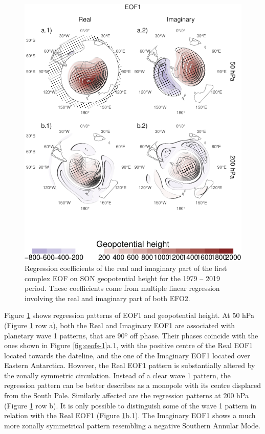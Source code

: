 \documentclass[smallextended]{svjour3}       %
\begin{document}
\begin{figure}
\centering
\includegraphics{../figures/eof1-regr-gh-1.pdf}
\caption{\label{fig:eof1-regr-gh}Regression coefficients of the real and imaginary part of the first complex EOF on SON geopotential height for the 1979 -- 2019 period. These coefficients come from multiple linear regression involving the real and imaginary part of both EFO2.}
\end{figure}

Figure \ref{fig:eof1-regr-gh} shows regression patterns of EOF1 and geopotential height. At 50 hPa (Figure \ref{fig:eof1-regr-gh} row a), both the Real and Imaginary EOF1 are associated with planetary wave 1 patterns, that are 90º off phase. Their phases coincide with the ones shown in Figure \ref{fig:ceofs-1}a.1, with the positive centre of the Real EOF1 located towards the dateline, and the one of the Imaginary EOF1 located over Eastern Antarctica. However, the Real EOF1 pattern is substantially altered by the zonally symmetric circulation. Instead of a clear wave 1 pattern, the regression pattern can be better describes as a monopole with its centre displaced from the South Pole.
Similarly affected are the regression patterns at 200 hPa (Figure \ref{fig:eof1-regr-gh} row b). It is only possible to distinguish some of the wave 1 pattern in relation with the Real EOF1 (Figure \ref{fig:eof1-regr-gh}b.1). The Imaginary EOF1 shows a much more zonally symmetrical pattern resembling a negative Southern Annular Mode.
\end{document}

